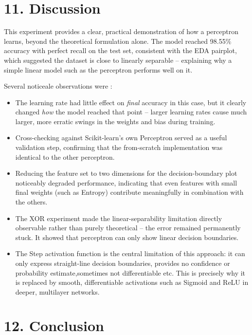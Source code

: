 \documentclass[11pt]{article}
\begin{document}
\section*{11. Discussion}

This experiment provides a clear, practical demonstration of how a perceptron learns, beyond the theoretical formulation alone. The model reached 98.55\% accuracy with perfect recall on the test set, consistent with the EDA pairplot, which suggested the dataset is close to linearly separable -- explaining why a simple linear model such as the perceptron performs well on it.

Several noticeale observations were :

\begin{itemize}[leftmargin=*]
\item The learning rate had little effect on \textit{final} accuracy in this case, but it clearly changed \textit{how} the model reached that point -- larger learning rates cause much larger, more erratic swings in the weights and bias during training.
\item Cross-checking against Scikit-learn's own Perceptron served as a useful validation step, confirming that the from-scratch implementation was identical to the other perceptron.
\item Reducing the feature set to two dimensions for the decision-boundary plot noticeably degraded performance, indicating that even features with small final weights (such as Entropy) contribute meaningfully in combination with the others.
\item The XOR experiment made the linear-separability limitation directly observable rather than purely theoretical -- the error remained permanently stuck. It showed that perceptron can only show linear decision boundaries.
\item The Step activation function is the central limitation of this approach: it can only express straight-line decision boundaries, provides no confidence or probability estimate,sometimes not differentiable etc. This is precisely why it is replaced by smooth, differentiable activations such as Sigmoid and ReLU in deeper, multilayer networks.
\end{itemize}


\section*{12. Conclusion}
\end{document}
